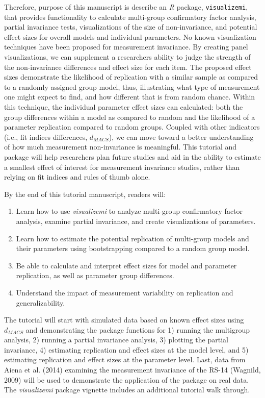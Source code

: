 \documentclass[
  man]{apa7}
\providecommand{\tightlist}{%
  \setlength{\itemsep}{0pt}\setlength{\parskip}{0pt}}
\begin{document}
Therefore, purpose of this manuscript is describe an \emph{R} package, \texttt{visualizemi}, that provides functionality to calculate multi-group confirmatory factor analysis, partial invariance tests, visualizations of the size of non-invariance, and potential effect sizes for overall models and individual parameters. No known visualization techniques have been proposed for measurement invariance. By creating panel visualizations, we can supplement a researchers ability to judge the strength of the non-invariance differences and effect size for each item. The proposed effect sizes demonstrate the likelihood of replication with a similar sample as compared to a randomly assigned group model, thus, illustrating what type of measurement one might expect to find, and how different that is from random chance. Within this technique, the individual parameter effect sizes can calculated: both the group differences within a model as compared to random and the likelihood of a parameter replication compared to random groups. Coupled with other indicators (i.e., fit indices differences, \(d_{MACS}\)), we can move toward a better understanding of how much measurement non-invariance is meaningful. This tutorial and package will help researchers plan future studies and aid in the ability to estimate a smallest effect of interest for measurement invariance studies, rather than relying on fit indices and rules of thumb alone.

By the end of this tutorial manuscript, readers will:

\begin{enumerate}
\def\labelenumi{\arabic{enumi}.}
\tightlist
\item
  Learn how to use \emph{visualizemi} to analyze multi-group confirmatory factor analysis, examine partial invariance, and create visualizations of parameters.
\item
  Learn how to estimate the potential replication of multi-group models and their parameters using bootstrapping compared to a random group model.
\item
  Be able to calculate and interpret effect sizes for model and parameter replication, as well as parameter group differences.
\item
  Understand the impact of measurement variability on replication and generalizability.
\end{enumerate}

The tutorial will start with simulated data based on known effect sizes using \(d_{MACS}\) and demonstrating the package functions for 1) running the multigroup analysis, 2) running a partial invariance analysis, 3) plotting the partial invariance, 4) estimating replication and effect sizes at the model level, and 5) estimating replication and effect sizes at the parameter level. Last, data from Aiena et al. (2014) examining the measurement invariance of the RS-14 (Wagnild, 2009) will be used to demonstrate the application of the package on real data. The \emph{visualizemi} package vignette includes an additional tutorial walk through.
\end{document}
